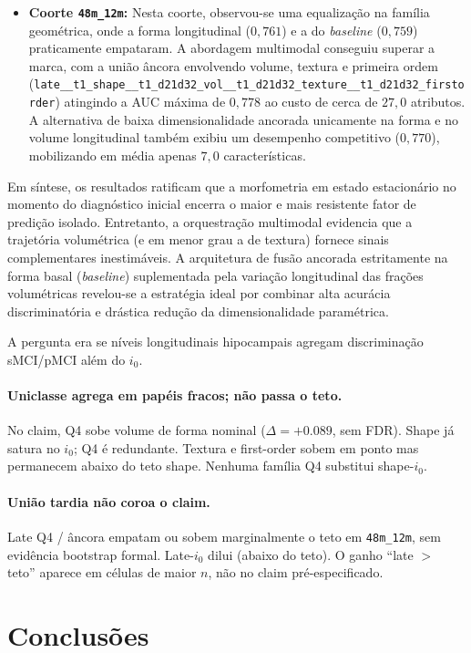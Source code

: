 \documentclass[review]{elsarticle}
\newcommand{\code}[1]{\texttt{#1}}
\begin{document}
\begin{itemize}
	\item \textbf{Coorte \code{48m\_12m}:} Nesta coorte, observou-se uma equalização na família geométrica, onde a forma longitudinal ($0,761$) e a do \textit{baseline} ($0,759$) praticamente empataram. A abordagem multimodal conseguiu superar a marca, com a união âncora envolvendo volume, textura e primeira ordem (\code{late\_\_t1\_shape\_\_t1\_d21d32\_vol\_\_t1\_d21d32\_texture\_\_t1\_d21d32\_firstorder}) atingindo a AUC máxima de $0,778$ ao custo de cerca de $27,0$ atributos. A alternativa de baixa dimensionalidade ancorada unicamente na forma e no volume longitudinal também exibiu um desempenho competitivo ($0,770$), mobilizando em média apenas $7,0$ características.
\end{itemize}

Em síntese, os resultados ratificam que a morfometria em estado estacionário no momento do diagnóstico inicial encerra o maior e mais resistente fator de predição isolado. Entretanto, a orquestração multimodal evidencia que a trajetória volumétrica (e em menor grau a de textura) fornece sinais complementares inestimáveis. A arquitetura de fusão ancorada estritamente na forma basal (\textit{baseline}) suplementada pela variação longitudinal das frações volumétricas revelou-se a estratégia ideal por combinar alta acurácia discriminatória e drástica redução da dimensionalidade paramétrica.

A pergunta era se níveis longitudinais hipocampais agregam discriminação sMCI/pMCI além do $i_0$.

\paragraph{Uniclasse agrega em papéis fracos; não passa o teto.}
No claim, Q4 sobe volume de forma nominal ($\Delta=+0.089$, sem FDR).
Shape já satura no $i_0$; Q4 é redundante.
Textura e first-order sobem em ponto mas permanecem abaixo do teto shape.
Nenhuma família Q4 substitui shape-$i_0$.

\paragraph{União tardia não coroa o claim.}
Late Q4 / âncora empatam ou sobem marginalmente o teto em \code{48m\_12m},
sem evidência bootstrap formal.
Late-$i_0$ dilui (abaixo do teto).
O ganho ``late $>$ teto'' aparece em células de maior $n$, não no claim pré-especificado.

\section{Conclusões}\label{sec:Conclusions}
\end{document}

